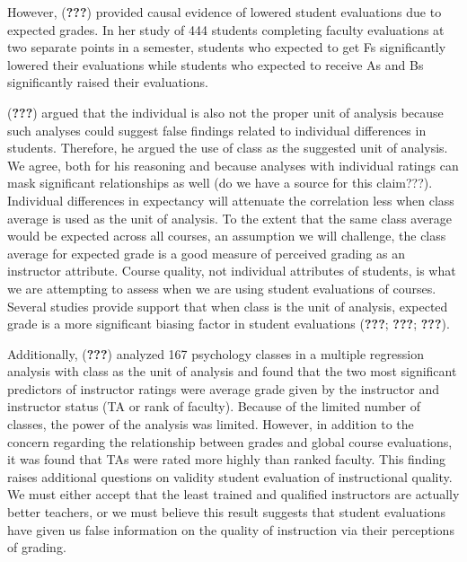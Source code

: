 \documentclass[man]{apa6}
\theoremstyle{definition}
\theoremstyle{definition}
\theoremstyle{definition}
\theoremstyle{remark}
\begin{document}
However, ({\textbf{???}}) provided causal evidence of lowered student
evaluations due to expected grades. In her study of 444 students
completing faculty evaluations at two separate points in a semester,
students who expected to get Fs significantly lowered their evaluations
while students who expected to receive As and Bs significantly raised
their evaluations.

({\textbf{???}}) argued that the individual is also not the proper unit
of analysis because such analyses could suggest false findings related
to individual differences in students. Therefore, he argued the use of
class as the suggested unit of analysis. We agree, both for his
reasoning and because analyses with individual ratings can mask
significant relationships as well (do we have a source for this
claim???). Individual differences in expectancy will attenuate the
correlation less when class average is used as the unit of analysis. To
the extent that the same class average would be expected across all
courses, an assumption we will challenge, the class average for expected
grade is a good measure of perceived grading as an instructor attribute.
Course quality, not individual attributes of students, is what we are
attempting to assess when we are using student evaluations of courses.
Several studies provide support that when class is the unit of analysis,
expected grade is a more significant biasing factor in student
evaluations ({\textbf{???}}; {\textbf{???}}; {\textbf{???}}).

Additionally, ({\textbf{???}}) analyzed 167 psychology classes in a
multiple regression analysis with class as the unit of analysis and
found that the two most significant predictors of instructor ratings
were average grade given by the instructor and instructor status (TA or
rank of faculty). Because of the limited number of classes, the power of
the analysis was limited. However, in addition to the concern regarding
the relationship between grades and global course evaluations, it was
found that TAs were rated more highly than ranked faculty. This finding
raises additional questions on validity student evaluation of
instructional quality. We must either accept that the least trained and
qualified instructors are actually better teachers, or we must believe
this result suggests that student evaluations have given us false
information on the quality of instruction via their perceptions of
grading.
\end{document}
